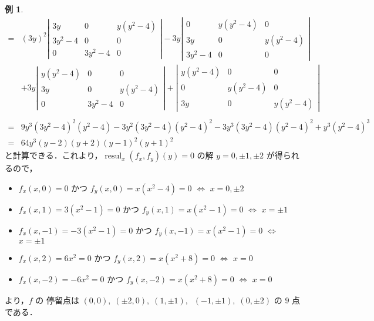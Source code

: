 \documentclass[12pt, uplatex, dvipdfmx]{jsarticle}
\theoremstyle{definition}
\newtheorem{example}{例}
\DeclareMathOperator{\resul}{resul}
\begin{document}
\begin{example}
\[\begin{aligned}
      = & (3y)^2 \left|
        \begin{array}{ccc}
          3y & 0 & y(y^2-4)\\
          3y^2-4 & 0 & 0\\
          0 & 3y^2-4 & 0
        \end{array}
      \right| - 3y \left|
        \begin{array}{ccc}
          0 & y(y^2-4) & 0\\
          3y & 0 & y(y^2-4)\\
          3y^2-4 & 0 & 0
        \end{array}
      \right|\\
      & + 3y \left|
        \begin{array}{ccc}
          y(y^2-4) & 0 & 0\\
          3y & 0 & y(y^2-4)\\
          0 & 3y^2-4 & 0
        \end{array}
      \right| + \left|
        \begin{array}{ccc}
          y(y^2-4) & 0 & 0\\
          0  & y(y^2-4) & 0\\
          3y & 0 & y(y^2-4)
        \end{array}
      \right|\\ \\
      = & 9y^3 ( 3y^2-4)^2 (y^2-4) - 3y^2(3y^2-4)(y^2-4)^2 -3y^3(3y^2-4)(y^2-4)^2 +y^3(y^2-4)^3\\
      = & 64 y^3 (y-2)(y+2) (y-1)^2(y+1)^2
    \end{aligned}
  \]
  \renewcommand{\arraystretch}{1}
  と計算できる．これより，$\resul_x(f_x,f_y)(y)=0$ の解 $y=0, \pm 1, \pm 2$ が得られるので，
  \begin{itemize}
  \item $f_x(x,0)=0$ かつ $f_y(x,0)=x(x^2-4)=0$ $\Leftrightarrow$ $x= 0, \pm 2$ 

  \item $f_x(x,1)=3(x^2-1)=0$ かつ $f_y(x,1)=x(x^2-1)=0$ $\Leftrightarrow$ $x=\pm 1$

  \item $f_x(x,-1) = -3(x^2-1)=0$ かつ $f_y(x,-1) = x(x^2-1)=0$ $\Leftrightarrow$ $x= \pm 1$

  \item $f_x(x,2) = 6x^2=0$ かつ $f_y(x,2)=x(x^2+8)=0$ $\Leftrightarrow$ $x=0$

  \item $f_x(x,-2)=-6x^2=0$ かつ $f_y(x,-2)=x(x^2+8)=0$ $\Leftrightarrow$ $x =0$
  \end{itemize}
  より，$f$ の 停留点は
  $(0,0), \; (\pm 2,0), \; (1,\pm 1), \; \; (-1, \pm 1), \;  (0,\pm 2)$ の $9$ 点である．
\end{example}
\end{document}
